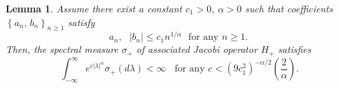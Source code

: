 \documentclass[a4paper]{article}%
\newtheorem{lemma}{Lemma}
\begin{document}
\begin{lemma}
\label{l4-2}Assume there exist a constant $c_{1}>0$, $\alpha>0$ such that
coefficients $\left\{  a_{n}\text{, }b_{n}\right\}  _{n\geq1}$ satisfy%
\begin{equation}
a_{n},\text{ }\left\vert b_{n}\right\vert \leq c_{1}n^{1/\alpha}%
\ \ \ \text{for any }n\geq1\text{.}\ \label{4-10}%
\end{equation}
Then, the spectral measure $\sigma_{+}$ of associated Jacobi operator $H_{+}$
satisfies%
\begin{equation}
\int_{-\infty}^{\infty}e^{c\left\vert \lambda\right\vert ^{\alpha}}\sigma
_{+}\left(  d\lambda\right)  <\infty\ \ \ \ \text{for any }c<\left(
9c_{1}^{2}\right)  ^{-\alpha/2}\left(  \dfrac{2}{\alpha}\right)  \text{.}
\label{4-11}%
\end{equation}

\end{lemma}
\end{document}
